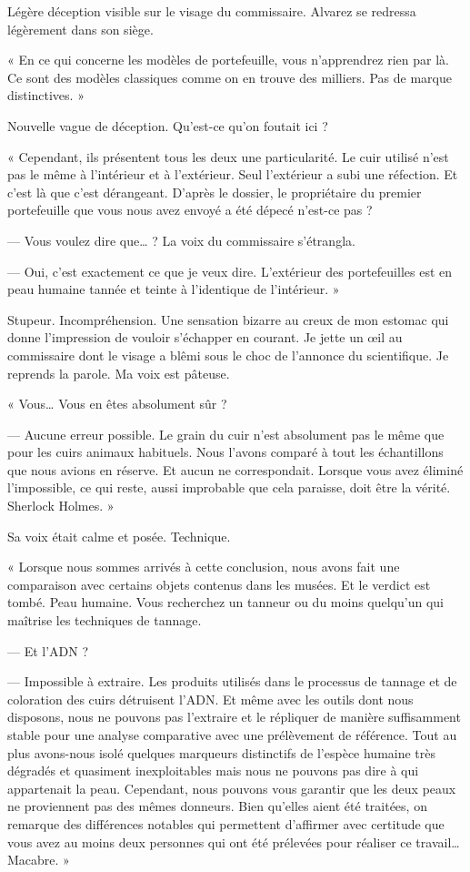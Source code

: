 Légère déception visible sur le visage du commissaire. Alvarez se redressa légèrement dans son siège.

« En ce qui concerne les modèles de portefeuille, vous n'apprendrez rien par là. Ce sont des modèles classiques comme 
on en trouve des milliers. Pas de marque distinctives. »

Nouvelle vague de déception. Qu'est-ce qu'on foutait ici ?

« Cependant, ils présentent tous les deux une particularité. Le cuir utilisé n'est pas le même à l'intérieur et à 
l'extérieur. Seul l'extérieur a subi une réfection. Et c'est là que c'est dérangeant. D'après le dossier, le 
propriétaire du premier portefeuille que vous nous avez envoyé a été dépecé n'est-ce pas ?

— Vous voulez dire que… ? La voix du commissaire s'étrangla.

— Oui, c'est exactement ce que je veux dire. L'extérieur des portefeuilles est en peau humaine tannée et teinte à 
l'identique de l'intérieur. »

Stupeur. Incompréhension. Une sensation bizarre au creux de mon estomac qui donne l'impression de vouloir s'échapper en 
courant. Je jette un œil au commissaire dont le visage a blêmi sous le choc de l'annonce du scientifique. Je reprends 
la parole. Ma voix est pâteuse.

« Vous… Vous en êtes absolument sûr ?

— Aucune erreur possible. Le grain du cuir n'est absolument pas le même que pour les cuirs animaux habituels. Nous 
l'avons comparé à tout les échantillons que nous avions en réserve. Et aucun ne correspondait. Lorsque vous avez éliminé 
l'impossible, ce qui reste, aussi improbable que cela paraisse, doit être la vérité. Sherlock Holmes. »

Sa voix était calme et posée. Technique.

« Lorsque nous sommes arrivés à cette conclusion, nous avons fait une comparaison avec certains objets contenus dans 
les musées. Et le verdict est tombé. Peau humaine. Vous recherchez un tanneur ou du moins quelqu'un qui maîtrise les 
techniques de tannage.

— Et l'ADN ?

— Impossible à extraire. Les produits utilisés dans le processus de tannage et de coloration des cuirs détruisent 
l'ADN. Et même avec les outils dont nous disposons, nous ne pouvons pas l'extraire et le répliquer de manière 
suffisamment stable pour une analyse comparative avec une prélèvement de référence. Tout au plus avons-nous isolé 
quelques marqueurs distinctifs de l'espèce humaine très dégradés et quasiment inexploitables mais nous ne pouvons pas 
dire à qui appartenait la peau. Cependant, nous pouvons vous garantir que les deux peaux ne proviennent pas des mêmes 
donneurs. Bien qu'elles aient été traitées, on remarque des différences notables qui permettent d'affirmer avec 
certitude que vous avez au moins deux personnes qui ont été prélevées pour réaliser ce travail… Macabre. »

